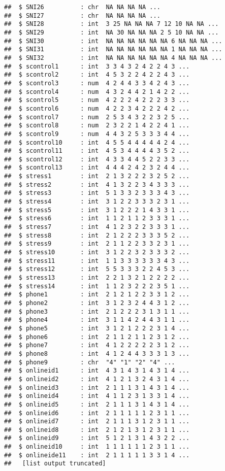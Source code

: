 \documentclass[
]{article}
\begin{document}
\begin{verbatim}
##  $ SNI26          : chr  NA NA NA NA ...
##  $ SNI27          : chr  NA NA NA NA ...
##  $ SNI28          : int  3 25 NA NA NA 7 12 10 NA NA ...
##  $ SNI29          : int  NA 30 NA NA NA 2 5 10 NA NA ...
##  $ SNI30          : int  NA NA NA NA NA NA 6 NA NA NA ...
##  $ SNI31          : int  NA NA NA NA NA NA 1 NA NA NA ...
##  $ SNI32          : int  NA NA NA NA NA NA 4 NA NA NA ...
##  $ scontrol1      : int  3 3 4 3 2 4 2 2 4 3 ...
##  $ scontrol2      : int  4 5 3 2 2 4 2 2 4 3 ...
##  $ scontrol3      : num  4 2 4 4 3 3 4 2 4 3 ...
##  $ scontrol4      : num  4 3 2 4 4 2 1 4 2 2 ...
##  $ scontrol5      : num  4 2 2 2 4 2 2 2 3 3 ...
##  $ scontrol6      : num  4 2 2 3 4 2 2 2 4 2 ...
##  $ scontrol7      : num  2 5 3 4 3 2 2 3 2 5 ...
##  $ scontrol8      : num  2 3 2 2 1 4 2 2 4 1 ...
##  $ scontrol9      : num  4 4 3 2 5 3 3 3 4 4 ...
##  $ scontrol10     : int  4 5 5 4 4 4 4 4 2 4 ...
##  $ scontrol11     : int  4 5 3 4 4 4 4 3 5 2 ...
##  $ scontrol12     : int  4 3 3 4 4 5 2 2 3 3 ...
##  $ scontrol13     : int  4 4 4 2 4 2 3 2 4 4 ...
##  $ stress1        : int  2 1 3 2 2 2 3 2 5 2 ...
##  $ stress2        : int  4 1 3 2 2 3 4 3 3 3 ...
##  $ stress3        : int  5 1 3 3 2 3 3 3 4 3 ...
##  $ stress4        : int  3 1 2 2 3 3 3 2 3 1 ...
##  $ stress5        : int  3 1 2 2 2 1 4 3 3 1 ...
##  $ stress6        : int  1 1 2 1 1 2 3 3 3 1 ...
##  $ stress7        : int  4 1 2 3 2 2 3 3 3 1 ...
##  $ stress8        : int  2 1 2 2 2 3 3 3 5 2 ...
##  $ stress9        : int  2 1 1 2 2 3 3 2 3 1 ...
##  $ stress10       : int  3 1 2 2 3 2 3 3 3 2 ...
##  $ stress11       : int  1 1 3 3 3 3 3 3 4 3 ...
##  $ stress12       : int  5 5 3 3 3 2 2 4 5 3 ...
##  $ stress13       : int  2 2 1 3 2 1 2 2 2 2 ...
##  $ stress14       : int  1 1 2 3 2 2 2 3 5 1 ...
##  $ phone1         : int  2 1 2 1 2 2 3 3 1 2 ...
##  $ phone2         : int  3 1 2 3 2 4 4 3 1 2 ...
##  $ phone3         : int  2 1 2 2 2 3 1 3 1 1 ...
##  $ phone4         : int  3 1 1 4 2 4 4 3 1 1 ...
##  $ phone5         : int  3 1 2 1 2 2 2 3 1 4 ...
##  $ phone6         : int  2 1 1 2 1 1 2 3 1 2 ...
##  $ phone7         : int  4 1 2 2 2 2 2 3 1 2 ...
##  $ phone8         : int  4 1 2 4 4 3 3 3 1 3 ...
##  $ phone9         : chr  "4" "1" "2" "4" ...
##  $ onlineid1      : int  4 3 1 4 3 1 4 3 1 4 ...
##  $ onlineid2      : int  4 1 2 1 3 2 4 3 1 4 ...
##  $ onlineid3      : int  2 1 1 1 3 1 4 3 1 4 ...
##  $ onlineid4      : int  4 1 1 2 3 1 3 3 1 4 ...
##  $ onlineid5      : int  2 1 1 1 3 1 4 3 1 4 ...
##  $ onlineid6      : int  2 1 1 1 1 1 2 3 1 1 ...
##  $ onlineid7      : int  2 1 1 1 3 1 2 3 1 1 ...
##  $ onlineid8      : int  2 1 2 1 3 1 2 3 1 1 ...
##  $ onlineid9      : int  5 1 2 1 3 1 4 3 2 2 ...
##  $ onlineid10     : int  1 1 1 1 1 1 2 3 1 1 ...
##  $ onlineide11    : int  2 1 1 1 1 1 3 3 1 4 ...
##   [list output truncated]
\end{verbatim}
\end{document}
